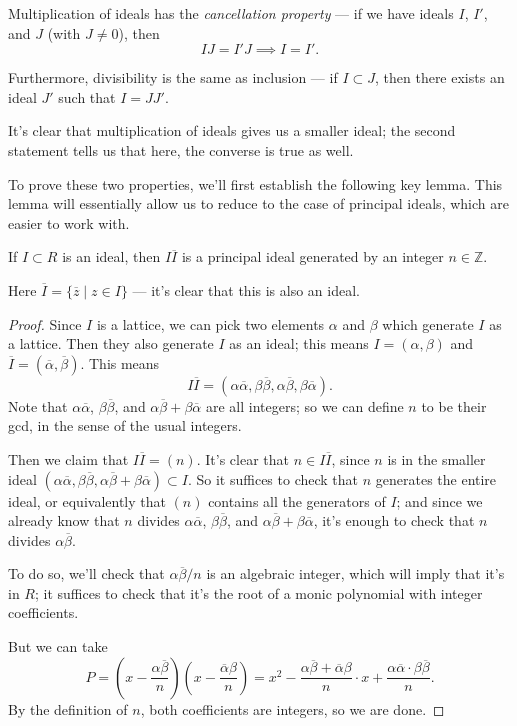 \begin{proposition} \label{key proposition}
    Multiplication of ideals has the \emph{cancellation property} --- if we have ideals $I$, $I'$, and $J$ (with $J \neq 0$), then \[IJ = I'J \implies I = I'.\] 
    
    Furthermore, divisibility is the same as inclusion --- if $I \subset J$, then there exists an ideal $J'$ such that $I = JJ'$. 
\end{proposition}

It's clear that multiplication of ideals gives us a smaller ideal; the second statement tells us that here, the converse is true as well. 

To prove these two properties, we'll first establish the following key lemma. This lemma will essentially allow us to reduce to the case of principal ideals, which are easier to work with.

\begin{lemma} \label{I Iconj is principal}
    If $I \subset R$ is an ideal, then $I\overline{I}$ is a principal ideal generated by an integer $n \in \mathbb{Z}$. 
\end{lemma}

Here $\overline{I} = \{\overline{z} \mid z \in I\}$ --- it's clear that this is also an ideal. 

\begin{proof}
    Since $I$ is a lattice, we can pick two elements $\alpha$ and $\beta$ which generate $I$ as a lattice. Then they also generate $I$ as an ideal; this means $I = (\alpha, \beta)$ and $\overline{I} = (\overline{\alpha}, \overline{\beta})$. This means \[I\overline{I} = (\alpha\overline{\alpha}, \beta\overline{\beta}, \alpha\overline{\beta}, \beta\overline{\alpha}).\] Note that $\alpha\overline{\alpha}$, $\beta\overline{\beta}$, and $\alpha\overline{\beta} + \beta\overline{\alpha}$ are all integers; so we can define $n$ to be their gcd, in the sense of the usual integers. 
    
    Then we claim that $I\overline{I} = (n)$. It's clear that $n \in I\overline{I}$, since $n$ is  in the smaller ideal $(\alpha\overline{\alpha}, \beta\overline{\beta}, \alpha\overline{\beta} + \beta\overline{\alpha}) \subset I$. So it suffices to check that $n$ generates the entire ideal, or equivalently that $(n)$ contains all the generators of $I$; and since we already know that $n$ divides $\alpha\overline{\alpha}$, $\beta\overline{\beta}$, and $\alpha\overline{\beta} + \beta\overline{\alpha}$, it's enough to check that $n$ divides $\alpha\overline{\beta}$. 
    
    To do so, we'll check that $\alpha \overline{\beta}/n$ is an algebraic integer, which will imply that it's in $R$; it suffices to check that it's the root of a monic polynomial with integer coefficients. 
    
    But we can take \[P = \left(x - \frac{\alpha\overline{\beta}}{n}\right)\left(x - \frac{\overline{\alpha}\beta}{n}\right) = x^2 - \frac{\alpha\overline{\beta} + \overline{\alpha}\beta}{n}\cdot x + \frac{\alpha \overline{\alpha}\cdot \beta\overline{\beta}}{n}.\] By the definition of $n$, both coefficients are integers, so we are done. 
\end{proof}




